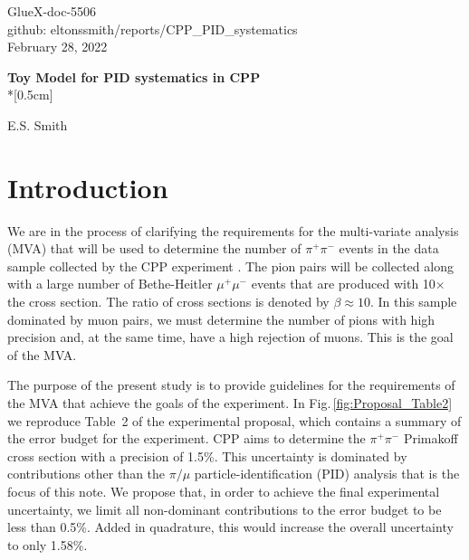 \documentclass[12pt]{article}
\begin{document}
\begin{flushright}
GlueX-doc-5506\\
github: eltonssmith/reports/CPP\_PID\_systematics\\
February 28, 2022
\end{flushright}




\begin{center}
{\Large \bf Toy Model for PID systematics in CPP}\\*[0.5cm]
\end{center}

\begin{center}   
{\sc  E.S. Smith}\\  
\end{center}


\section{Introduction}
We are in the process of clarifying the requirements for the multi-variate analysis (MVA) that will be used to determine the number
of $\pi^+\pi^-$ events in the data sample collected by the CPP experiment \cite{CPPexp}.  The pion pairs will be collected along with 
a large number of Bethe-Heitler $\mu^+\mu^-$ events that are produced with 10$\times$ the cross section. The ratio of cross sections is 
denoted by $\beta\approx 10$. In this sample dominated by muon pairs, we must determine the number of pions with high precision
and, at the same time, have a high rejection of muons. This is the goal of the MVA. 

The purpose of the present study is to provide guidelines for the requirements of the MVA that achieve the goals of the experiment. In Fig.\,\ref{fig:Proposal_Table2} 
we reproduce Table~2 of the experimental proposal, which contains a summary of the error budget for the experiment. CPP aims to determine
the $\pi^+\pi^-$ Primakoff cross section with a precision of 1.5\%. This uncertainty is dominated by contributions other than the $\pi/\mu$ 
particle-identification (PID) analysis that is the focus of this note. We propose that, in order to achieve the final experimental uncertainty, 
we limit all non-dominant contributions to the error budget to be less than 0.5\%. Added in quadrature, this would increase the overall uncertainty to only 1.58\%. 
\end{document}
